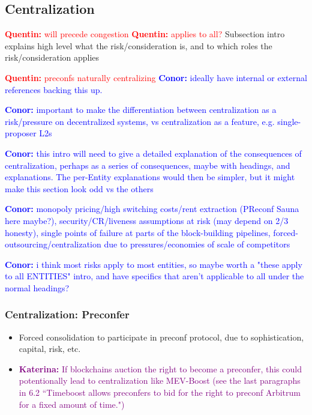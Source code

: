 \documentclass[a4paper]{article}
\theoremstyle{boldstyle}
\newcommand{\cm}[1]{\textcolor{blue}{\textbf{Conor:} #1}}
\newcommand{\qb}[1]{\textcolor{red}{\textbf{Quentin:} #1}}
\newcommand{\ks}[1]{\textcolor{purple}{\textbf{Katerina:} #1}}
\begin{document}
        
    

\subsection{Centralization} \qb{will precede congestion} \qb{applies to all?}
    Subsection intro explains high level what the risk/consideration is, and to which roles the risk/consideration applies
    
    \qb{preconfs naturally centralizing} \cm{ideally have internal or external references backing this up.}
    
    \cm{important to make the differentiation between centralization as a risk/pressure on decentralized systems, vs centralization as a feature, e.g. single-proposer L2s}
    
    \cm{this intro will need to give a detailed explanation of the consequences of centralization, perhaps as a series of consequences, maybe with headings, and explanations. The per-Entity explanations would then be simpler, but it might make this section look odd vs the others}
    
    \cm{monopoly pricing/high switching costs/rent extraction (PReconf Sauna here maybe?), security/CR/liveness assumptions at risk (may depend on 2/3 honesty), single points of failure at parts of the block-building pipelines, forced-outsourcing/centralization due to pressures/economies of scale of competitors}

    \cm{i think most risks apply to most entities, so maybe worth a "these apply to all ENTITIES" intro, and have specifics that aren't applicable to all under the normal headings?}
    
    \subsubsection{Centralization: Preconfer}
        \begin{itemize}
            \item Forced consolidation to participate in preconf protocol, due to sophistication, capital, risk, etc.
            \item \ks{ If blockchains auction the right to become a preconfer, this could potentionally lead to centralization like MEV-Boost (see the last paragraphs in 6.2  ``Timeboost allows preconfers to bid for the right to preconf Arbitrum for a fixed amount
of time.")}
        \end{itemize}
    
\end{document}
